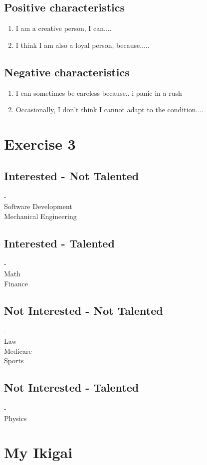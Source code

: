 \documentclass[12pt,titlepage]{article}
\begin{document}
\subsection*{Positive characteristics}
\begin{enumerate}
    \item I am a creative person, I can.... 
    \item I think I am also a loyal person, because..... 
\end{enumerate}
\subsection*{Negative characteristics}
\begin{enumerate}
    \item I can sometimes be careless because.. i panic in a rush
    \item Occasionally, I don’t think I cannot adapt to the condition.... 
\end{enumerate}

\section*{Exercise 3}
\subsection*{Interested - Not Talented}
- \\
Software Development \\
Mechanical Engineering
\subsection*{Interested - Talented}
- \\
Math \\
Finance
\subsection*{Not Interested - Not Talented}
- \\
Law \\
Medicare \\
Sports
\subsection*{Not Interested - Talented}
- \\
Physics

\section*{My Ikigai}
\end{document}
